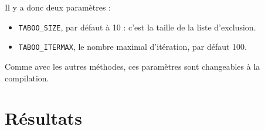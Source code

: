 \documentclass[12pt, a4paper]{article}
\begin{document}
Il y a donc deux paramètres :
\begin{itemize}
\item \texttt{TABOO\_{}SIZE}, par défaut à 10 : c'est la taille de la liste d'exclusion.
\item \texttt{TABOO\_{}ITERMAX}, le nombre maximal d'itération, par défaut 100.
\end{itemize}
Comme avec les autres méthodes, ces paramètres sont changeables à la compilation.

\section{Résultats}
\end{document}

